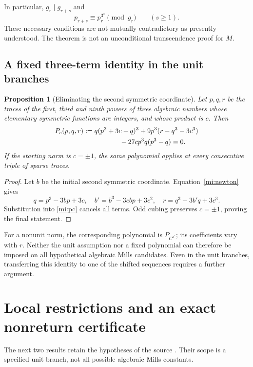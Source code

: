 \documentclass[11pt,a4paper]{article}
\numberwithin{equation}{section}
\newtheorem{proposition}[theorem]{Proposition}
\theoremstyle{definition}
\theoremstyle{remark}
\begin{document}
In particular, \(g_r\mid g_{r+s}\) and
\[
 p_{r+s}\equiv p_r^{3^s}\pmod{g_r}\qquad(s\ge1).
\]
These necessary conditions are not mutually contradictory as
presently understood. The theorem is not an unconditional
transcendence proof for \(M\).

\subsection{A fixed three-term identity in the unit branches}
\label{mi:unit}

\begin{proposition}[Eliminating the second symmetric coordinate]
\label{mi:unit-polynomial}
Let \(p,q,r\) be the traces of the first, third and ninth powers
of three algebraic numbers whose elementary symmetric functions
are integers, and whose product is \(c\).
Then
\begin{align}
 P_c(p,q,r):={}&q(p^3+3c-q)^3
     +9p^3(r-q^3-3c^3) \notag\\
 &\hspace{13mm}-27cp^3q(p^3-q)=0.
 \label{mi:pc}
\end{align}
If the starting norm is \(c=\pm1\), the same polynomial applies
at every consecutive triple of sparse traces.
\end{proposition}

\begin{proof}
Let \(b\) be the initial second symmetric coordinate.
Equation~\eqref{mi:newton} gives
\[
 q=p^3-3bp+3c,\quad
 b'=b^3-3cbp+3c^2,\quad
 r=q^3-3b'q+3c^3.
\]
Substitution into \eqref{mi:pc} cancels all terms.
Odd cubing preserves \(c=\pm1\), proving the final statement.
\end{proof}

For a nonunit norm, the corresponding polynomial is
\(P_{C^{3^r}}\); its coefficients vary with \(r\).
Neither the unit assumption nor a fixed polynomial can therefore
be imposed on all hypothetical algebraic Mills candidates.
Even in the unit branches, transferring this identity to one of
the shifted sequences requires a further argument.

\section{Local restrictions and an exact nonreturn certificate}
\label{mi:local}

The next two results retain the hypotheses of the source
\cite{VMRC031}. Their scope is a specified unit branch, not all
possible algebraic Mills constants.
\end{document}
